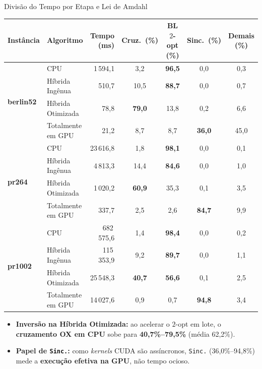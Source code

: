 \begin{frame}{Divisão do Tempo por Etapa e Lei de Amdahl}
  \begin{slidetabeladensa}[0.48\textheight]
    \begin{tabular}{@{}llrcccc@{}}
      \toprule
      \textbf{Instância} & \textbf{Algoritmo} & \textbf{Tempo (ms)} & \textbf{Cruz.\ (\%)} & \textbf{BL $2$-opt (\%)} & \textbf{Sinc.\ (\%)} & \textbf{Demais (\%)} \\
      \midrule
      \multirow{4}{*}{\textbf{berlin52}}
        & CPU               & 1\,594,1   & 3,2           & \textbf{96,5} & 0,0           & 0,3 \\
        & Híbrida Ingênua   & 510,7      & 10,5          & \textbf{88,7} & 0,0           & 0,7 \\
        & Híbrida Otimizada & 78,8       & \textbf{79,0} & 13,8          & 0,2           & 6,6 \\
        & Totalmente em GPU & 21,2       & 8,7           & 8,7           & \textbf{36,0} & 45,0 \\
      \midrule
      \multirow{4}{*}{\textbf{pr264}}
        & CPU               & 23\,616,8  & 1,8           & \textbf{98,1} & 0,0           & 0,1 \\
        & Híbrida Ingênua   & 4\,813,3   & 14,4          & \textbf{84,6} & 0,0           & 1,0 \\
        & Híbrida Otimizada & 1\,020,2   & \textbf{60,9} & 35,3          & 0,1           & 3,5 \\
        & Totalmente em GPU & 337,7      & 2,5           & 2,6           & \textbf{84,7} & 9,9 \\
      \midrule
      \multirow{4}{*}{\textbf{pr1002}}
        & CPU               & 682\,575,6 & 1,4           & \textbf{98,4} & 0,0           & 0,2 \\
        & Híbrida Ingênua   & 115\,353,9 & 9,2           & \textbf{89,7} & 0,0           & 1,1 \\
        & Híbrida Otimizada & 25\,548,3  & \textbf{40,7} & \textbf{56,6} & 0,1           & 2,5 \\
        & Totalmente em GPU & 14\,027,6  & 0,9           & 0,7           & \textbf{94,8} & 3,4 \\
      \bottomrule
    \end{tabular}
  \end{slidetabeladensa}

  \vspace{0.06cm}
  \begin{itemize}
    \footnotesize
    \item \textbf{Inversão na Híbrida Otimizada:} ao acelerar o $2$-opt em lote, o \textbf{cruzamento OX em CPU} sobe para \textbf{40,7\%--79,5\%} (média 62,2\%).
    \item \textbf{Papel de \texttt{Sinc.}:} como \emph{kernels} CUDA são assíncronos, \texttt{Sinc.} (36,0\%--94,8\%) mede a \textbf{execução efetiva na GPU}, não tempo ocioso.
  \end{itemize}
\end{frame}

